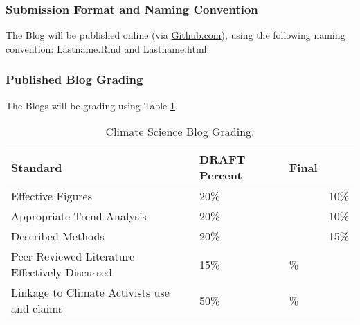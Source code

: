 \subsubsection{Submission Format and Naming Convention}

The Blog will be published online (via \url{Github.com}), using the following naming convention: Lastname.Rmd and Lastname.html. 

\subsubsection{Published Blog Grading}

The Blogs will be grading using Table \ref{tab:bloggrading}. 

\begin{table}[h]
\caption{Climate Science Blog Grading.}
\label{tab:bloggrading}
\begin{tabular}{llll}\hline
Standard              &   DRAFT Percent   & Final \\ \hline\hline
Effective Figures             & 20\% &    & 10\% \\
Appropriate Trend Analysis    & 20\% &    & 10\% \\
Described Methods             & 20\% &    & 15\% \\
Peer-Reviewed Literature Effectively Discussed & 15\% & \%\\
Linkage to Climate Activists use and claims    & 50\% & \%\\
\hline
\end{tabular}
\end{table}


